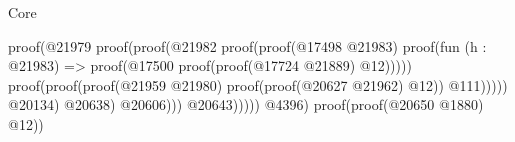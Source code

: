 \begin{lexlean}{Core}
\begin{coremodule}
                                                                                                        proof(@21979
                                                                                                            proof(proof(@21982
                                                                                                                  proof(proof(@17498
                                                                                                                        @21983)
                                                                                                                      proof(fun (h : @21983) =>
                                                                                                                        proof(@17500
                                                                                                                            proof(proof(@17724
                                                                                                                                  @21889)
                                                                                                                                @12)))))
                                                                                                                proof(proof(proof(@21959
                                                                                                                        @21980)
                                                                                                                      proof(proof(@20627
                                                                                                                            @21962)
                                                                                                                          @12))
                                                                                                                    @111)))))
                                                                                                    @20134)
                                                                                                  @20638)
                                                                                                @20606)))
                                                                                        @20643)))))
                                                                            @4396)
                                                                          proof(proof(@20650 @1880)
                                                                              @12))

\end{coremodule}
\end{lexlean}

